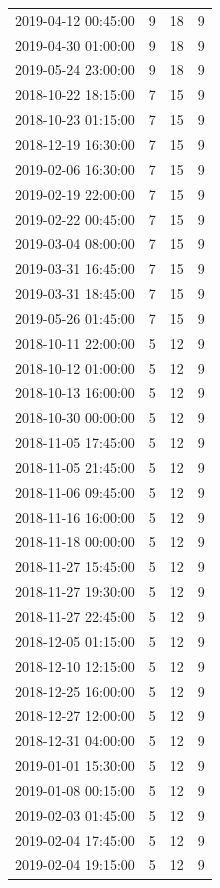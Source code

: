\begin{tabular}{lrrr}
2019-04-12 00:45:00 & 9 & 18 & 9 \\
2019-04-30 01:00:00 & 9 & 18 & 9 \\
2019-05-24 23:00:00 & 9 & 18 & 9 \\
2018-10-22 18:15:00 & 7 & 15 & 9 \\
2018-10-23 01:15:00 & 7 & 15 & 9 \\
2018-12-19 16:30:00 & 7 & 15 & 9 \\
2019-02-06 16:30:00 & 7 & 15 & 9 \\
2019-02-19 22:00:00 & 7 & 15 & 9 \\
2019-02-22 00:45:00 & 7 & 15 & 9 \\
2019-03-04 08:00:00 & 7 & 15 & 9 \\
2019-03-31 16:45:00 & 7 & 15 & 9 \\
2019-03-31 18:45:00 & 7 & 15 & 9 \\
2019-05-26 01:45:00 & 7 & 15 & 9 \\
2018-10-11 22:00:00 & 5 & 12 & 9 \\
2018-10-12 01:00:00 & 5 & 12 & 9 \\
2018-10-13 16:00:00 & 5 & 12 & 9 \\
2018-10-30 00:00:00 & 5 & 12 & 9 \\
2018-11-05 17:45:00 & 5 & 12 & 9 \\
2018-11-05 21:45:00 & 5 & 12 & 9 \\
2018-11-06 09:45:00 & 5 & 12 & 9 \\
2018-11-16 16:00:00 & 5 & 12 & 9 \\
2018-11-18 00:00:00 & 5 & 12 & 9 \\
2018-11-27 15:45:00 & 5 & 12 & 9 \\
2018-11-27 19:30:00 & 5 & 12 & 9 \\
2018-11-27 22:45:00 & 5 & 12 & 9 \\
2018-12-05 01:15:00 & 5 & 12 & 9 \\
2018-12-10 12:15:00 & 5 & 12 & 9 \\
2018-12-25 16:00:00 & 5 & 12 & 9 \\
2018-12-27 12:00:00 & 5 & 12 & 9 \\
2018-12-31 04:00:00 & 5 & 12 & 9 \\
2019-01-01 15:30:00 & 5 & 12 & 9 \\
2019-01-08 00:15:00 & 5 & 12 & 9 \\
2019-02-03 01:45:00 & 5 & 12 & 9 \\
2019-02-04 17:45:00 & 5 & 12 & 9 \\
2019-02-04 19:15:00 & 5 & 12 & 9 \\

\end{tabular}
